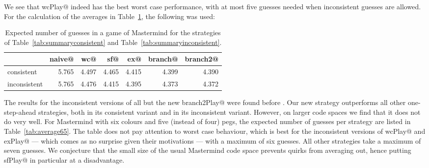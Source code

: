 \documentclass[a4paper]{article}
\makeatletter
\theoremstyle{definition}
\newcommand{\cmd}[1]{\Verb@#1@}
\newcommand{\ignore}[1]{}  %
\makeatother
\begin{document}
We see that \cmd{wcPlay} indeed has the best worst case performance, with at most five guesses needed when inconsistent guesses are allowed.
For the calculation of the averages in Table~\ref{tab:average}, the following was used:


\ignore{$}
\begin{table}
\centering
\begin{tabular}{l|rrrrrr}
	& \cmd{naive}	& \cmd{wc}	& \cmd{sf}	& \cmd{ex}	& \cmd{branch}	& \cmd{branch2} \\
\hline
consistent	& 5.765	& 4.497	& 4.465	& 4.415	& 4.399	& 4.390 \\
inconsistent	& 5.765	& 4.476	& 4.415	& 4.395	& 4.373	& 4.372
\end{tabular}
\caption{Expected number of guesses in a game of Mastermind for the strategies of Table~\ref{tab:summaryconsistent} and Table~\ref{tab:summaryinconsistent}.}
\label{tab:average}
\end{table}

The results for the inconsistent versions of all but the new \cmd{branch2Play} were found before \citep{Kooi2005:yams,Ville2013:aoms}.
Our new strategy outperforms all other one-step-ahead strategies, both in its consistent variant and in its inconsistent variant.
However, on larger code spaces we find that it does not do very well.
For Mastermind with six colours and five (instead of four) pegs, the expected number of guesses per strategy are listed in Table~\ref{tab:average65}.
The table does not pay attention to worst case behaviour, which is best for the inconsistent versions of \cmd{wcPlay} and \cmd{exPlay} --- which comes as no surprise given their motivations --- with a maximum of six guesses.
All other strategies take a maximum of seven guesses.
We conjecture that the small size of the usual Mastermind code space prevents quirks from averaging out, hence putting \cmd{sfPlay} in particular at a disadvantage.
\end{document}

